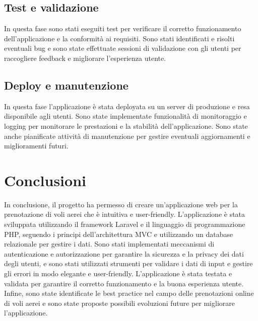 \documentclass{article}
\begin{document}
\subsection{Test e validazione}

In questa fase sono stati eseguiti test per verificare il corretto funzionamento dell'applicazione e la conformità ai requisiti. Sono stati identificati e risolti eventuali bug e sono state effettuate sessioni di validazione con gli utenti per raccogliere feedback e migliorare l'esperienza utente.
\subsection{Deploy e manutenzione}

In questa fase l'applicazione è stata deployata su un server di produzione e resa disponibile agli utenti. Sono state implementate funzionalità di monitoraggio e logging per monitorare le prestazioni e la stabilità dell'applicazione. Sono state anche pianificate attività di manutenzione per gestire eventuali aggiornamenti e miglioramenti futuri.



\section{Conclusioni}
In conclusione, il progetto ha permesso di creare un'applicazione web per la prenotazione di voli aerei che è intuitiva e user-friendly. L'applicazione è stata sviluppata utilizzando il framework Laravel e il linguaggio di programmazione PHP, seguendo i principi dell'architettura MVC e utilizzando un database relazionale per gestire i dati. Sono stati implementati meccanismi di autenticazione e autorizzazione per garantire la sicurezza e la privacy dei dati degli utenti, e sono stati utilizzati strumenti per validare i dati di input e gestire gli errori in modo elegante e user-friendly. L'applicazione è stata testata e validata per garantire il corretto funzionamento e la buona esperienza utente. Infine, sono state identificate le best practice nel campo delle prenotazioni online di voli aerei e sono state proposte possibili evoluzioni future per migliorare l'applicazione.



\end{document}
